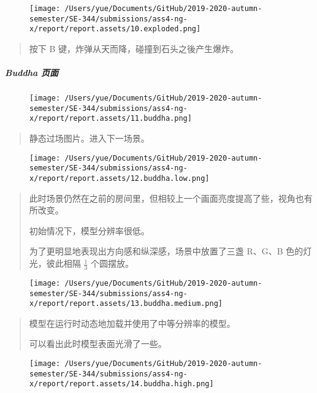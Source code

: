 \documentclass[
]{article}
\begin{document}
\begin{figure}
\centering
\texttt{[image: /Users/yue/Documents/GitHub/2019-2020-autumn-semester/SE-344/submissions/ass4-ng-x/report/report.assets/10.exploded.png]}
\caption{}
\end{figure}

\begin{quote}
按下 B 键，炸弹从天而降，碰撞到石头之後产生爆炸。
\end{quote}

\hypertarget{header-n55}{%
\subparagraph{Buddha 页面}\label{header-n55}}

\begin{figure}
\centering
\texttt{[image: /Users/yue/Documents/GitHub/2019-2020-autumn-semester/SE-344/submissions/ass4-ng-x/report/report.assets/11.buddha.png]}
\caption{}
\end{figure}

\begin{quote}
静态过场图片。进入下一场景。
\end{quote}

\begin{figure}
\centering
\texttt{[image: /Users/yue/Documents/GitHub/2019-2020-autumn-semester/SE-344/submissions/ass4-ng-x/report/report.assets/12.buddha.low.png]}
\caption{}
\end{figure}

\begin{quote}
此时场景仍然在之前的房间里，但相较上一个画面亮度提高了些，视角也有所改变。

初始情况下，模型分辨率很低。

为了更明显地表现出方向感和纵深感，场景中放置了三盏 R、G、B
色的灯光，彼此相隔 \(\frac 1 3\) 个圆摆放。
\end{quote}

\begin{figure}
\centering
\texttt{[image: /Users/yue/Documents/GitHub/2019-2020-autumn-semester/SE-344/submissions/ass4-ng-x/report/report.assets/13.buddha.medium.png]}
\caption{}
\end{figure}

\begin{quote}
模型在运行时动态地加载并使用了中等分辨率的模型。

可以看出此时模型表面光滑了一些。
\end{quote}

\begin{figure}
\centering
\texttt{[image: /Users/yue/Documents/GitHub/2019-2020-autumn-semester/SE-344/submissions/ass4-ng-x/report/report.assets/14.buddha.high.png]}
\caption{}
\end{figure}
\end{document}
